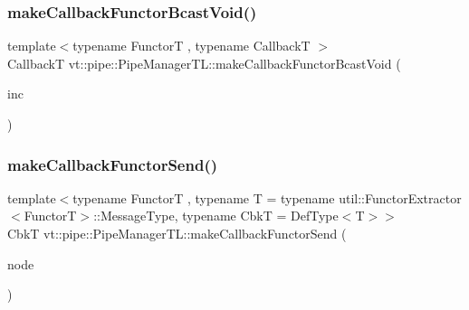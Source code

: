 \subsubsection{\texorpdfstring{make\+Callback\+Functor\+Bcast\+Void()}{makeCallbackFunctorBcastVoid()}\hspace{0.1cm}{\footnotesize\ttfamily [2/2]}}
{\footnotesize\ttfamily template$<$typename FunctorT , typename CallbackT $>$ \\
CallbackT vt\+::pipe\+::\+Pipe\+Manager\+T\+L\+::make\+Callback\+Functor\+Bcast\+Void (\begin{DoxyParamCaption}\item[{bool const \&}]{inc }\end{DoxyParamCaption})}

\mbox{\label{structvt_1_1pipe_1_1_pipe_manager_t_l_a446f98d0a74d66539a411e1d41caa505}} 
\subsubsection{\texorpdfstring{make\+Callback\+Functor\+Send()}{makeCallbackFunctorSend()}\hspace{0.1cm}{\footnotesize\ttfamily [1/2]}}
{\footnotesize\ttfamily template$<$typename FunctorT , typename T  = typename util\+::\+Functor\+Extractor$<$\+Functor\+T$>$\+::\+Message\+Type, typename CbkT  = Def\+Type$<$\+T$>$$>$ \\
CbkT vt\+::pipe\+::\+Pipe\+Manager\+T\+L\+::make\+Callback\+Functor\+Send (\begin{DoxyParamCaption}\item[{\hyperlink{namespacevt_a866da9d0efc19c0a1ce79e9e492f47e2}{Node\+Type} const \&}]{node }\end{DoxyParamCaption})}

\mbox{\label{structvt_1_1pipe_1_1_pipe_manager_t_l_a2e9eb336fb5e2f6927b64068411ff2c8}} 
